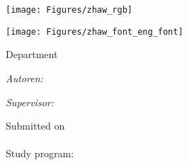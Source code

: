 

\begin{titlepage}

\setlength{\parskip}{0pt}

\begin{center}
\texttt{[image: Figures/zhaw\_rgb]}

\ifxetex
    \vspace{0.6cm}
    {\zhawtitlefont\color{zhawblue}\LARGE \univname\par}   %
    \vspace{0.2cm}
\else
    \vspace{0.87cm}
    {\texttt{[image: Figures/zhaw\_font\_eng\_font]}\par}
    \vspace{0.05cm}
\fi
{\Large Department \deptname\par}                      %
\vspace{0.2cm}
{\Large \instname\par}                                 %
\vspace{3.5cm}                            
\textsc{\Large \ttype}                                 %
\vspace{0.2cm}
\HRule 
\vspace{0.4cm}
{\huge \bfseries \ttitle\par}                          %
\vspace{0.4cm}  
\HRule
\vspace{1.5cm}

 
\begin{minipage}[t]{0.4\textwidth}
\begin{flushleft} 
    \large
    \emph{Autoren:}\\
    \authorname
\end{flushleft}
\end{minipage}
\begin{minipage}[t]{0.4\textwidth}
\begin{flushright} 
    \large
    \emph{Supervisor:}\\
    \supnameA
    \ifdefempty{\supnameB}{}{\\ \supnameB}
\end{flushright}
\end{minipage}
\vspace{2cm}
 
\vfill

{\large
Submitted on\\
\tdate\\
\vspace{1.5cm}
Study program:\\
\studyprog\\
}
\vfill
\end{center}
\end{titlepage}
\restoregeometry
